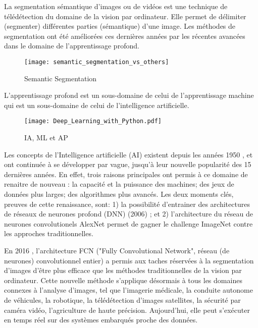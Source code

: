 ﻿\par La segmentation sémantique d'images ou de vidéos est une technique de télédétection du domaine de la vision par ordinateur. Elle permet de délimiter (segmenter) différentes parties (sémantique) d'une image. Les méthodes de segmentation ont été améliorées ces dernières années par les récentes avancées dans le domaine de l'apprentissage profond. 
\begin{figure}[H]
   \centering
   \texttt{[image: semantic\_segmentation\_vs\_others]}
   \caption{Semantic Segmentation \cite[p.~1]{wu_recent_2019}}
   \label{fig:semantic_segmentation_vs_others}
\end{figure}
\par L’apprentissage profond est un sous-domaine de celui de l'apprentissage machine qui est un sous-domaine de celui de l'intelligence artificielle. 
\begin{figure}[H]
   \centering
   \texttt{[image: Deep\_Learning\_with\_Python.pdf]}
   \caption{IA, ML et AP \cite[p.~4]{chollet_deep_2018}}
   \label{fig:ia_ml_ap}
\end{figure}
\par Les concepts de l'Intelligence artificielle (AI) existent depuis les années 1950 \cite[p.~4]{chollet_deep_2018} \cite[p.~1]{alom_history_2018}, et ont continuée à se développer par vague, jusqu'à leur nouvelle popularité des 15 dernières années. En effet, trois raisons principales ont permis à ce domaine de renaitre de nouveau \cite[p.~20]{chollet_deep_2018}: la capacité et la puissance des machines; des jeux de données plus larges; des algorithmes plus avancés. Les deux moments clés, preuves de cette renaissance, sont: 1) la possibilité d'entrainer des architectures de réseaux de neurones profond (DNN) (2006) \cite[p.~6]{alom_history_2018}; et 2) l'architecture du réseau de neurones convolutionels AlexNet permet de  gagner le challenge ImageNet contre les approches traditionnelles\cite[p.~11]{alom_history_2018}. 
\par En 2016 \cite[p.~14]{alom_history_2018}, l'architecture FCN ("Fully Convolutional Network", réseau (de neurones) convolutionnel entier) a permis aux taches réservées à la segmentation d'images d'être plus efficace que les méthodes traditionnelles de la vision par ordinateur. Cette nouvelle méthode s'applique désormais à tous les domaines connexes à l'analyse d'images, tel que l'imagerie médicale, la conduite autonome de véhicules, la robotique, la télédétection d'images satellites, la sécurité par caméra vidéo, l'agriculture de haute précision. Aujourd'hui, elle peut s'exécuter en temps réel sur des systèmes embarqués proche des données. 